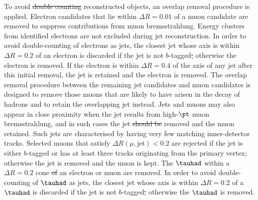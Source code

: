 \documentclass[PAPER, coverpage, atlasdraft=true, texlive=2016, UKenglish]{\ATLASLATEXPATH atlasdoc}
\providecommand{\DIFadd}[1]{{\protect\color{blue}\uwave{#1}}} %
\providecommand{\DIFdel}[1]{{\protect\color{red}\sout{#1}}}                      %
\providecommand{\DIFaddbegin}{} %
\providecommand{\DIFaddend}{} %
\providecommand{\DIFdelbegin}{} %
\providecommand{\DIFdelend}{} %
\begin{document}
To avoid \DIFdelbegin \DIFdel{double counting }\DIFdelend \DIFaddbegin \DIFadd{double-counting of }\DIFaddend reconstructed objects, an overlap removal procedure is applied.
Electron candidates that lie 
within $\Delta R = 0.01$ of a muon candidate are removed to suppress contributions from muon bremsstrahlung. 
Energy clusters from identified electrons are not excluded during jet reconstruction. 
In order to avoid double-counting of electrons as jets, the closest jet whose axis is within ${\Delta}R = 0.2$ of an electron 
is discarded if the jet is not $b$-tagged\DIFdelbegin \DIFdel{, }\DIFdelend \DIFaddbegin \DIFadd{; }\DIFaddend otherwise the electron is removed.
If the electron is within ${\Delta}R = 0.4$ of the axis of any jet after this initial removal, the jet is retained and  the electron is removed.
The overlap removal procedure between the remaining jet candidates and muon candidates is designed to remove those muons 
that are likely to have arisen in the decay of hadrons and to retain the overlapping jet instead. 
Jets and muons may also appear in close proximity when the jet results from high-$\pt$ muon bremsstrahlung, 
and in such cases the jet \DIFdelbegin \DIFdel{should be }\DIFdelend \DIFaddbegin \DIFadd{is }\DIFaddend removed and the muon retained. Such jets are characterised by having very 
few matching inner-detector tracks. Selected muons that satisfy $\Delta R(\mu,{\textrm{jet}}) < 0.2$ are rejected
if the jet is either $b$-tagged or has at least three tracks originating from the primary vertex; otherwise the jet is removed and the muon is kept.
The $\tauhad$ within a $\Delta R=0.2$ cone \DIFdelbegin \DIFdel{of }\DIFdelend \DIFaddbegin \DIFadd{around }\DIFaddend an electron or muon are removed.
In order to avoid double-counting of $\tauhad$ as jets, the closest jet whose axis is
within ${\Delta}R = 0.2$ of a $\tauhad$ is discarded if the jet is not $b$-tagged\DIFdelbegin \DIFdel{, }\DIFdelend \DIFaddbegin \DIFadd{; }\DIFaddend otherwise the $\tauhad$ is removed. 
\end{document}
